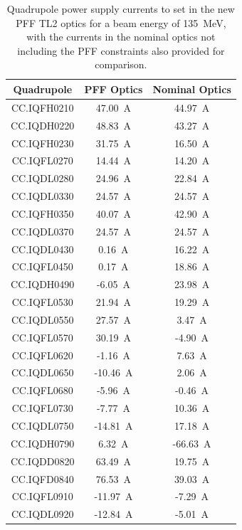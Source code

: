 \begin{table}
  \begin{center}
    \begin{tabular}{|c c c|}
	    \hline
        Quadrupole & PFF Optics & Nominal Optics \\ \hline
		CC.IQFH0210 &	47.00~A & 44.97~A \\
		CC.IQDH0220 &	48.83~A & 43.27~A \\
		CC.IQFH0230 &	31.75~A & 16.50~A \\
		CC.IQFL0270 &	14.44~A & 14.20~A \\
		CC.IQDL0280 &	24.96~A & 22.84~A \\
		CC.IQDL0330 &	24.57~A & 24.57~A \\
		CC.IQFH0350 &	40.07~A & 42.90~A \\
		CC.IQDL0370 &	24.57~A & 24.57~A \\
		CC.IQDL0430 &	0.16~A & 16.22~A \\
		CC.IQFL0450 &	0.17~A & 18.86~A \\
		CC.IQDH0490 &	-6.05~A & 23.98~A \\
		CC.IQFL0530 &	21.94~A & 19.29~A \\
		CC.IQDL0550 &	27.57~A & 3.47~A \\
		CC.IQFL0570 &	30.19~A & -4.90~A \\
		CC.IQFL0620 &	-1.16~A & 7.63~A \\
		CC.IQDL0650 &	-10.46~A & 2.06~A \\
		CC.IQFL0680 &	-5.96~A & -0.46~A \\
		CC.IQFL0730 &	-7.77~A & 10.36~A \\
		CC.IQDL0750 &	-14.81~A & 17.18~A \\
		CC.IQDH0790 &	6.32~A & -66.63~A \\
		CC.IQDD0820 &	63.49~A & 19.75~A \\
		CC.IQFD0840 &	76.53~A & 39.03~A \\
		CC.IQFL0910 &	-11.97~A & -7.29~A \\
		CC.IQDL0920 &	-12.84~A & -5.01~A \\
	   \hline
    \end{tabular}
    \caption{Quadrupole power supply currents to set in the new PFF TL2 optics for a beam energy of 135~MeV, with the currents in the nominal optics not including the PFF constraints also provided for comparison.}
  	\label{t:pffOpticsQuads}
  \end{center}


\end{table}
